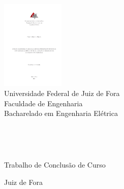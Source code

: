 \thispagestyle{empty}
\begin{center}

\includegraphics[width=3.0cm]{./logos/ufjf_logo}\\
\medskip
Universidade Federal de  Juiz de Fora\\
Faculdade de Engenharia\\
Bacharelado em Engenharia Elétrica

\vfill

\Autor\\

\vfill


\TITULO\\

\vfill

Trabalho de Conclusão de Curso\\

\vfill

Juiz de Fora\\
\Ano\\

\end{center}
\newpage
